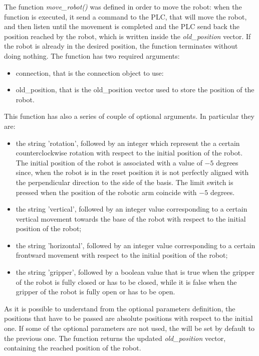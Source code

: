 The function \textit{move\_robot()} was defined in order to move the robot: when the function is executed, it send a command to the PLC, that will move the robot, and then listen until the movement is completed and the PLC send back the position reached by the robot, which is written inside the \textit{old\_position} vector. If the robot is already in the desired position, the function terminates without doing nothing. The function has two required arguments:
\begin{itemize}
    \item connection, that is the connection object to use:
    \item old\_position, that is the old\_position vector used to store the position of the robot.
\end{itemize}
This function has also a series of couple of optional arguments. In particular they are:
\begin{itemize}
    \item the string 'rotation', followed by an integer which represent the a certain counterclockwise rotation with respect to the initial position of the robot. The initial position of the robot is associated with a value of $-5$ degrees since, when the robot is in the reset position it is not perfectly aligned with the perpendicular direction to the side of the basis. The limit switch is pressed when the position of the robotic arm coincide with $-5$ degrees.
    \item the string 'vertical', followed by an integer value corresponding to a certain vertical movement towards the base of the robot with respect to the initial position of the robot;
    \item the string 'horizontal', followed by an integer value corresponding to a certain frontward movement with respect to the initial position of the robot;
    \item the string 'gripper', followed by a boolean value that is true when the gripper of the robot is fully closed or has to be closed, while it is false when the gripper of the robot is fully open or has to be open. 
\end{itemize}

As it is possible to understand from the optional parameters definition, the positions that have to be passed are absolute positions with respect to the initial one.
If some of the optional parameters are not used, the will be set by default to the previous one.
The function returns the updated \textit{old\_position} vector, containing the reached position of the robot.

